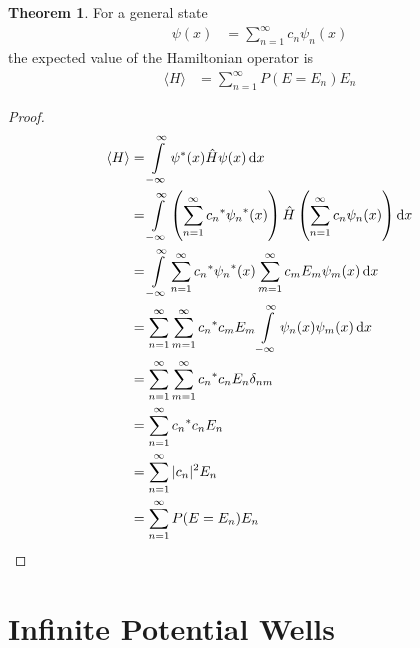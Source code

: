 \documentclass[titlepage, fleqn, a4paper, 12pt, twoside]{article}
\theoremstyle{definition}
\theoremstyle{theorem}
\newtheorem{theorem}{Theorem}
\let\Oldsection\section
\renewcommand{\section}{\FloatBarrier\Oldsection}
\begin{document}
\begin{theorem}
	For a general state
	\begin{align*}
		\psi(x) &= \sum\limits_{n = 1}^{\infty} c_n \psi_n(x)
	\end{align*}
	the expected value of the Hamiltonian operator is
	\begin{align*}
		\langle H \rangle &= \sum\limits_{n = 1}^{\infty} P(E = E_n) E_n
	\end{align*}
\end{theorem}

\begin{proof}
	\begin{align*}
		\langle H \rangle &= \int\limits_{-\infty}^{\infty} \psi^*(x) \hat{H} \psi(x) \dif x\\
		&= \int\limits_{-\infty}^{\infty} \left( \sum\limits_{n = 1}^{\infty} {c_n}^* {\psi_n}^*(x) \right) \hat{H} \left( \sum\limits_{n = 1}^{\infty} c_n \psi_n(x) \right) \dif x\\
		&= \int\limits_{-\infty}^{\infty} \sum\limits_{n = 1}^{\infty} {c_n}^* {\psi_n}^*(x) \sum\limits_{m = 1}^{\infty} c_m E_m \psi_m(x) \dif x\\
		&= \sum\limits_{n = 1}^{\infty} \sum\limits_{m = 1}^{\infty} {c_n}^* c_m E_m \int\limits_{-\infty}^{\infty} {\psi_n}(x) \psi_m(x) \dif x\\
		&= \sum\limits_{n = 1}^{\infty} \sum\limits_{m = 1}^{\infty} {c_n}^* c_n E_n \delta_{n m}\\
		&= \sum\limits_{n = 1}^{\infty} {c_n}^* c_n E_n\\
		&= \sum\limits_{n = 1}^{\infty} |c_n|^2 E_n\\
		&= \sum\limits_{n = 1}^{\infty} P(E = E_n) E_n
	\end{align*}
\end{proof}

\section{Infinite Potential Wells}
\end{document}
